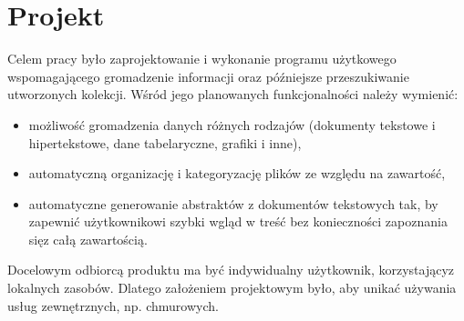 \documentclass[12pt,a4paper,twoside]{article}
\begin{document}
\section{Projekt}
Celem pracy było zaprojektowanie i wykonanie programu użytkowego wspomagającego gromadzenie informacji oraz późniejsze przeszukiwanie utworzonych kolekcji. 
Wśród jego planowanych funkcjonalności należy wymienić:
\begin{itemize}
	\item możliwość gromadzenia danych różnych rodzajów (dokumenty tekstowe i hipertekstowe, dane tabelaryczne, grafiki i inne),
	\item automatyczną organizację i kategoryzację plików ze względu na zawartość,
	\item automatyczne generowanie abstraktów z dokumentów tekstowych tak, by zapewnić użytkownikowi szybki wgląd w treść bez konieczności zapoznania się\break z całą zawartością.
\end{itemize}
Docelowym odbiorcą produktu ma być indywidualny użytkownik, korzystający\break z lokalnych zasobów. Dlatego założeniem projektowym było, aby unikać używania usług zewnętrznych, np. chmurowych.
\end{document}

